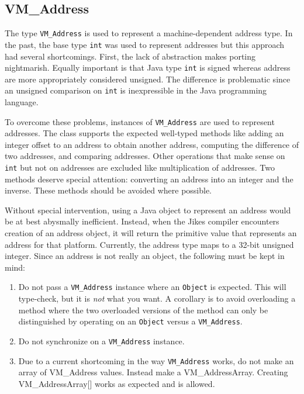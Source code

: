 \subsection{VM\_Address}
The type {\tt VM\_Address} is used to represent a machine-dependent
address type.  In the past, the base type {\tt int} was used to
represent addresses but this approach had several shortcomings.
First, the lack of abstraction makes porting nightmarish.  Equally
important is that Java type {\tt int} is signed whereas address are
more appropriately considered unsigned.  The difference is problematic
since an unsigned comparison on {\tt int} is inexpressible in the Java
programming language.

To overcome these problems, instances of {\tt VM\_Address} are used to
represent addresses.  The class supports the expected well-typed
methods like adding an integer offset to an address to obtain another
address, computing the difference of two addresses, and comparing
addresses.  Other operations that make sense on {\tt int} but not on
addresses are excluded like multiplication of addresses.  Two methods
deserve special attention: converting an address into an integer and
the inverse.  These methods should be avoided where possible.

Without special intervention, using a Java object to represent an
address would be at best abysmally inefficient.  Instead, when the
Jikes compiler encounters creation of an address object, it will
return the primitive value that represents an address for that
platform.  Currently, the address type maps to a 32-bit unsigned
integer.  Since an address is not really an object, the following must
be kept in mind:

\begin{enumerate}
\item{} Do not pass a {\tt VM\_Address} instance where an {\tt Object}
is expected. This will type-check, but it is {\em not} what you want.  A
corollary is to avoid overloading a method where the two overloaded
versions of the method can only be distinguished by operating on an
{\tt Object}  versus a {\tt VM\_Address}. 
\item{} Do not synchronize on a {\tt VM\_Address} instance.
\item{} Due to a current shortcoming in the way {\tt VM\_Address} works, do not make an
array of {VM\_Address} values.  Instead make a
{VM\_AddressArray}. Creating {VM\_AddressArray[]} works as expected
and is allowed.
\end{enumerate}


